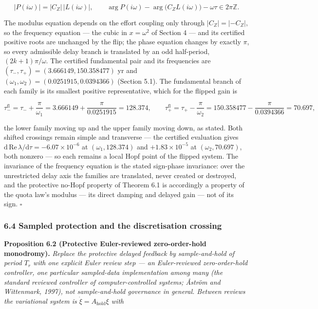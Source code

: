\documentclass[11pt]{article}
\begin{document}
\[|P(i\omega)| = |C_Z|\,|L(i\omega)|, \qquad \arg P(i\omega) - \arg\bigl(C_Z L(i\omega)\bigr) - \omega\tau \in 2\pi\mathbb Z.\]

The modulus equation depends on the effort coupling only through
\(|C_Z| = |-C_Z|\), so the frequency equation --- the cubic in
\(x = \omega^2\) of Section 4 --- and its certified positive roots are
unchanged by the flip; the phase equation changes by exactly \(\pi\), so
every admissible delay branch is translated by an odd half-period,
\((2k+1)\pi/\omega\). The certified fundamental pair and its frequencies
are \((\tau_-, \tau_+) = (3.666149, 150.358477)\) yr and
\((\omega_1, \omega_2) = (0.0251915, 0.0394366)\) (Section 5.1). The
fundamental branch of each family is its smallest positive
representative, which for the flipped gain is

\[\tau_-^{\mathrm{fl}} = \tau_- + \frac{\pi}{\omega_1} = 3.666149 + \frac{\pi}{0.0251915} = 128.374, \qquad \tau_+^{\mathrm{fl}} = \tau_+ - \frac{\pi}{\omega_2} = 150.358477 - \frac{\pi}{0.0394366} = 70.697,\]

the lower family moving up and the upper family moving down, as stated.
Both shifted crossings remain simple and transverse --- the certified
evaluation gives
\(\mathrm{d}\,\mathrm{Re}\,\lambda/\mathrm{d}\tau = -6.07\times10^{-6}\)
at \((\omega_1, 128.374)\) and \(+1.83\times10^{-5}\) at
\((\omega_2, 70.697)\), both nonzero --- so each remains a local Hopf
point of the flipped system. The invariance of the frequency equation is
the stated sign-phase invariance: over the unrestricted delay axis the
families are translated, never created or destroyed, and the protective
no-Hopf property of Theorem 6.1 is accordingly a property of the quota
law's modulus --- its direct damping and delayed gain --- not of its
sign. \ensuremath{\square}

\subsubsection{6.4 Sampled protection and the discretisation
crossing}\label{sampled-protection-and-the-discretisation-crossing}

\textbf{Proposition 6.2 (Protective Euler-reviewed zero-order-hold
monodromy).} \emph{Replace the protective delayed feedback by
sample-and-hold of period \(T_r\) with one explicit Euler review step
--- an Euler-reviewed zero-order-hold controller, one particular
sampled-data implementation among many (the standard reviewed controller
of computer-controlled systems; \AA{}str\"om and Wittenmark, 1997), not
sample-and-hold governance in general. Between reviews the variational
system is \(\dot\xi = A_{\mathrm{hold}}\xi\) with}
\end{document}
